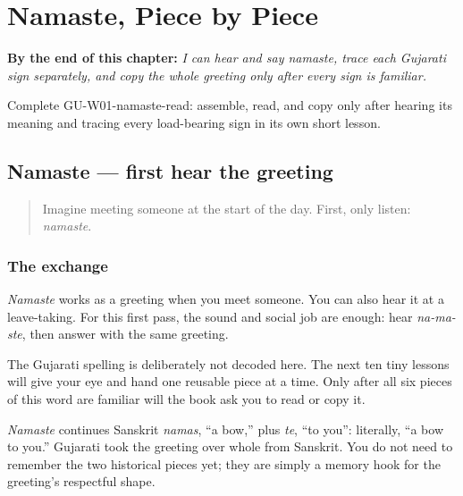 
\chapter{Namaste, Piece by Piece}
\label{ch:first-greeting-script}

\begin{chapteropening}
\textbf{By the end of this chapter:} \emph{I can hear and say namaste, trace each Gujarati sign separately, and copy the whole greeting only after every sign is familiar.}

Complete GU-W01-namaste-read: assemble, read, and copy  only after hearing its meaning and tracing every load-bearing sign in its own short lesson.
\end{chapteropening}

\section[\texorpdfstring{\gu{નમસ્તે} (namaste)}{નમસ્તે (namaste)}]{Namaste — first hear the greeting}

\label{lesson:GU-C01-namaste}



\begin{quote}
Imagine meeting someone at the start of the day. First, only listen: \emph{namaste}.
\end{quote}

\subsection*{The exchange}
\emph{Namaste} works as a greeting when you meet someone. You can also hear it at a leave-taking. For this first pass, the sound and social job are enough: hear \emph{na-ma-ste}, then answer with the same greeting.

The Gujarati spelling is deliberately not decoded here. The next ten tiny lessons will give your eye and hand one reusable piece at a time. Only after all six pieces of this word are familiar will the book ask you to read or copy it.

\begin{cousinweb}
\emph{Namaste} continues Sanskrit \emph{namas}, \textquotedblleft{}a bow,\textquotedblright{} plus \emph{te}, \textquotedblleft{}to you\textquotedblright{}: literally, \textquotedblleft{}a bow to you.\textquotedblright{} Gujarati took the greeting over whole from Sanskrit. You do not need to remember the two historical pieces yet; they are simply a memory hook for the greeting's respectful shape.
\end{cousinweb}

